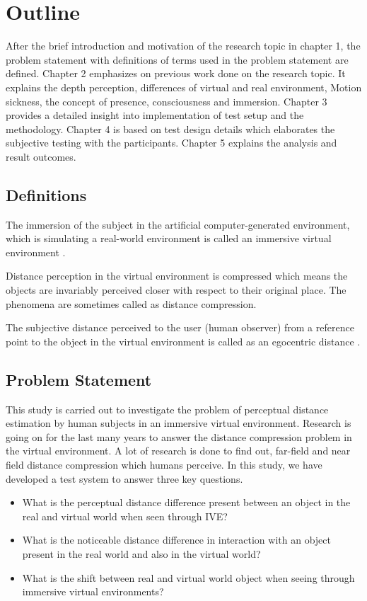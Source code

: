 \section{Outline}
After the brief introduction and motivation of the research topic in chapter 1, the problem statement with definitions of terms used in the problem statement are defined. Chapter 2 emphasizes on previous work done on the research topic. It explains the depth perception, differences of virtual and real environment, Motion sickness, the concept of presence, consciousness and immersion. Chapter 3 provides a detailed insight into implementation of test setup and the methodology. Chapter 4 is based on test design details which elaborates the subjective testing with the participants. Chapter 5 explains the analysis and result outcomes.



\subsection{Definitions}
The immersion of the subject in the artificial computer-generated environment, which is simulating a real-world environment is called an immersive virtual environment .\cite{wolfe2015communications}\par

Distance perception in the virtual environment is compressed which means the objects are invariably perceived closer with respect to their original place. The phenomena are sometimes called as distance compression.\cite{finnegan2016compensating} \par

The subjective distance perceived to the user (human observer) from a reference point to the object in the virtual environment is called as an egocentric distance \cite{renner2013perception}.

\subsection{Problem Statement}
This study is carried out to investigate the problem of perceptual distance estimation by human subjects in an immersive virtual environment. Research is going on for the last many years to answer the distance compression problem in the virtual environment. A lot of research is done to find out, far-field and near field distance compression which humans perceive. In this study, we have developed a test system to answer three key questions.
\begin{itemize}
    \item What is the perceptual distance difference present between an object in the real and virtual world when seen through IVE?
    \item What is the noticeable distance difference in interaction with an object present in the real world and also in the virtual world?
    \item What is the shift between real and virtual world object when seeing through immersive virtual environments?
\end{itemize}



